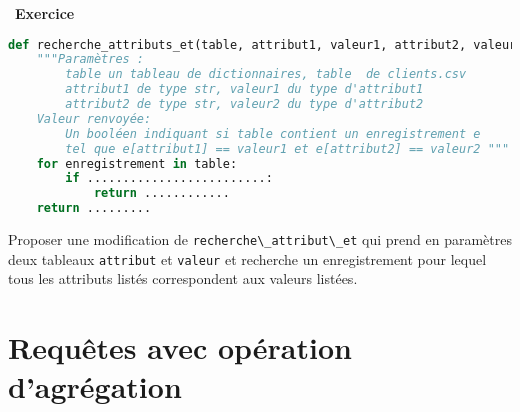 \documentclass[
  11pt,
]{article}
\newcommand{\passthrough}[1]{#1}
\newcounter{exo}
\newenvironment{exercice}[1]
{\par \medskip   \addtocounter{exo}{1} \noindent  
\begin{bclogo}[arrondi =0.1,   noborder = true, logo=\bccrayon, marge=4]{~\textbf{Exercice} \textbf{\theexo} {\itshape #1} }  \par}
{
\end{bclogo}
 \par \bigskip }
\newcounter{def}
\begin{document}
\begin{exercice}{}
\begin{lstlisting}[language=Python]
def recherche_attributs_et(table, attribut1, valeur1, attribut2, valeur2):
    """Paramètres : 
        table un tableau de dictionnaires, table  de clients.csv
        attribut1 de type str, valeur1 du type d'attribut1
        attribut2 de type str, valeur2 du type d'attribut2
    Valeur renvoyée:
        Un booléen indiquant si table contient un enregistrement e
        tel que e[attribut1] == valeur1 et e[attribut2] == valeur2 """
    for enregistrement in table:
        if .........................:
            return ............
    return .........
\end{lstlisting}

Proposer une modification de
\passthrough{\lstinline!recherche\_attribut\_et!} qui prend en
paramètres deux tableaux \passthrough{\lstinline!attribut!} et
\passthrough{\lstinline!valeur!} et recherche un enregistrement pour
lequel tous les attributs listés correspondent aux valeurs listées.

\end{exercice}

\hypertarget{requuxeates-avec-opuxe9ration-dagruxe9gation}{%
\section{Requêtes avec opération
d'agrégation}\label{requuxeates-avec-opuxe9ration-dagruxe9gation}}
\end{document}
